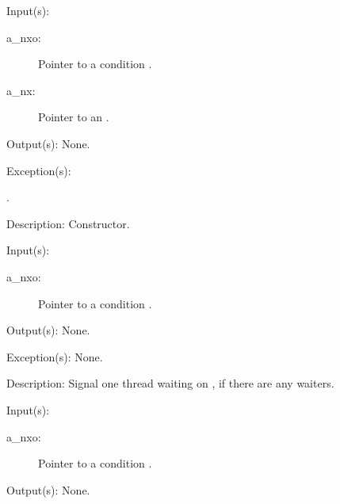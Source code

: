 \begin{capi}
\label{nxo_condition_new}
	\begin{capilist}
	\item[Input(s): ]
		\begin{description}\item[]
		\item[a\_nxo: ]
			Pointer to a condition .
		\item[a\_nx: ]
			Pointer to an .
		\end{description}
	\item[Output(s): ] None.
	\item[Exception(s): ]
		\begin{description}\item[]
		\item[.]
		\end{description}
	\item[Description: ]
		Constructor.
	\end{capilist}
\label{nxo_condition_signal}
	\begin{capilist}
	\item[Input(s): ]
		\begin{description}\item[]
		\item[a\_nxo: ]
			Pointer to a condition \classname{nxo}.
		\end{description}
	\item[Output(s): ] None.
	\item[Exception(s): ] None.
	\item[Description: ]
		Signal one thread waiting on , if there are any
		waiters.
	\end{capilist}
\label{nxo_condition_broadcast}
	\begin{capilist}
	\item[Input(s): ]
		\begin{description}\item[]
		\item[a\_nxo: ]
			Pointer to a condition .
		\end{description}
	\item[Output(s): ] None.

\end{capilist}
\end{capi}
